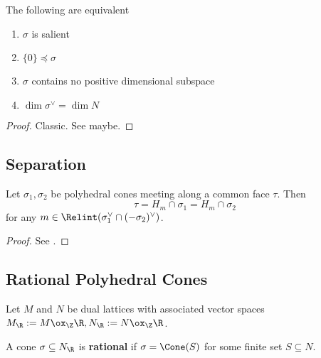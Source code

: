 \begin{proposition}
  \label{02-salient-cone-tfae}

  The following are equivalent
  \begin{enumerate}
    \item $\sigma$ is salient
    \item $\{0\} \preceq \sigma$
    \item $\sigma$ contains no positive dimensional subspace
    \item $\dim \sigma^\vee = \dim N$
  \end{enumerate}
\end{proposition}
\begin{proof}
  \uses{}

  Classic. See \cite{Oda_1988} maybe.
\end{proof}


\subsection{Separation}


\begin{lemma}
  \label{03-separation-lemma}

  Let $\sigma_1, \sigma_2$ be polyhedral cones meeting along a common face $\tau$. Then
  $$\tau = H_m \cap \sigma_1 = H_m \cap \sigma_2$$
  for any $m \in \Relint(\sigma_1^\vee \cap (-\sigma_2)^\vee)$.
\end{lemma}
\begin{proof}

  See \cite{Cox_2011}.
\end{proof}


\subsection{Rational Polyhedral Cones}


Let $M$ and $N$ be dual lattices with associated vector spaces $M_\R := M \ox_\Z \R, N_\R := N \ox_\Z \R$.


\begin{definition}
  \label{04-rat-cone}

  A cone $\sigma \subseteq N_\R$ is {\bf rational} if $\sigma = \Cone(S)$ for some finite set $S \subseteq N$.
\end{definition}


